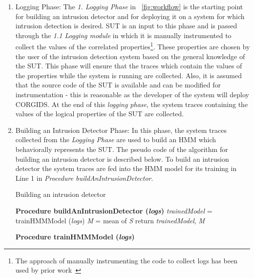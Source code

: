 \begin{enumerate}
\item {Logging Phase}: The \textit{1. Logging Phase} in ~\autoref{fig:workflow} is the starting point for building an intrusion detector and for deploying it on a system for which intrusion detection is desired. \ac{SUT} is an input to this phase and is passed through the \textit{1.1 Logging module} in which it is manually instrumented to collect the values of the correlated properties\footnote{The approach of manually instrumenting the code to collect logs has been used by prior work~\cite{chen2018learning,aliabadi2017artinali}}. These properties are chosen by the user of the intrusion detection system based on the general knowledge of the \ac{SUT}. This phase will ensure that the traces which contain the values of the properties while the system is running are collected. Also, it is assumed that the source code of the \ac{SUT} is available and can be modified for instrumentation - this is reasonable as the developer of the system will deploy \ac{CORGIDS}. At the end of this \textit{logging phase}, the system traces containing the values of the logical properties of the \ac{SUT} are collected.

\item {Building an Intrusion Detector Phase}: In this phase, the system traces collected from the \textit{Logging Phase} are used to build an \ac{HMM} which behaviorally represents the \ac{SUT}. The pseudo code of the algorithm for building an intrusion detector is described below. To build an intrusion detector the system traces are fed into the \ac{HMM} model for its training in Line 1 in \textit{Procedure buildAnIntrusionDetector}.

\begin{algorithm}
  \caption{Building an intrusion detector}
  \textbf{Procedure buildAnIntrusionDetector (\textit{logs})}\;
  \nl \textit{trainedModel} = trainHMMModel (\textit{logs})\;
  \nl {}
  \nl \textit{M} = mean of \textit{S}\;
  \nl return \textit{trainedModel}, \textit{M}\;

  \textbf{Procedure trainHMMModel (\textit{logs})}\;
  \nl {}
\end{algorithm}



\end{enumerate}
